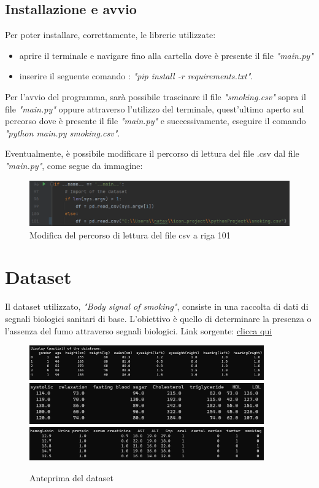 \documentclass{article}
\begin{document}
\subsection{Installazione e avvio}

Per poter installare, correttamente, le librerie utilizzate:
\begin{itemize}
    \item aprire il terminale e navigare fino alla cartella dove è presente il file \textit{"main.py"}
    \item inserire il seguente comando : \textit{"pip install -r requirements.txt"}.
\end{itemize}
%
Per l'avvio del programma, sarà possibile trascinare il file \textit{"smoking.csv"} sopra il file \textit{"main.py"} oppure attraverso l'utilizzo del terminale, quest'ultimo aperto sul percorso dove è presente il file \textit{"main.py"} e successivamente, eseguire il comando \textit{"python main.py smoking.csv"}.
%

\noindent
Eventualmente, è possibile modificare il percorso di lettura del file .csv dal file \textit{"main.py"}, come segue da immagine:

\begin{figure}[H]
        \includegraphics [width=0.8 cm + \textwidth]{modify}
        \centering
        \caption{Modifica del percorso di lettura del file csv a riga 101}
        \centering
\end{figure}

\section{Dataset}

Il dataset utilizzato, \textit{"Body signal of smoking"}, consiste in una raccolta di dati di segnali biologici sanitari di base. 
%
L'obiettivo è quello di determinare la presenza o l'assenza del fumo attraverso segnali biologici.
%
Link sorgente: \href{https://www.kaggle.com/datasets/kukuroo3/body-signal-of-smoking}{clicca qui}

\begin{figure}[H]
        \includegraphics[width=0.9\textwidth]{display 1}
        \includegraphics[width=0.9\textwidth]{display 2}
        \includegraphics[width=0.9\textwidth]{display 3}
        \centering
        \caption{Anteprima del dataset}
        \centering
\end{figure}
\end{document}
